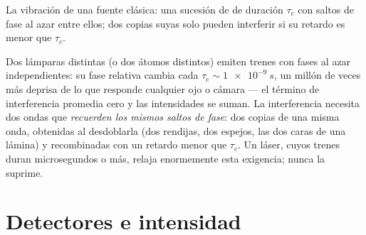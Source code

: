 \begin{omfigure}

{\small La vibración de una fuente clásica: una sucesión de  de duración $\tau_c$ con saltos de fase al azar entre ellos; dos
copias suyas solo pueden interferir si su retardo es menor que $\tau_c$.}
\end{omfigure}

\begin{remark}\label{rem:b2:scalar-light-model:twosources}
Dos lámparas distintas (o dos átomos distintos) emiten trenes con
fases al azar independientes: su fase relativa cambia cada $\tau_c
\sim \qty{1e-9}{s}$, un millón de veces más deprisa de lo que responde cualquier ojo
o cámara --- el término de interferencia promedia cero y las
intensidades se suman. La interferencia necesita dos ondas que \emph{recuerden los
mismos saltos de fase}: dos copias de una misma onda, obtenidas al desdoblarla
(dos rendijas, dos espejos, las dos caras de una lámina) y recombinadas con un
retardo menor que $\tau_c$. Un láser, cuyos trenes duran microsegundos o
más, relaja enormemente esta exigencia; nunca la suprime.
\end{remark}

\section{Detectores e intensidad}

